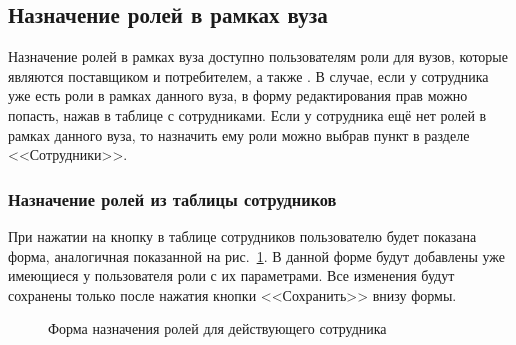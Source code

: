 \subsection{Назначение ролей в рамках вуза} \label{sec:university_role}

Назначение ролей в рамках вуза доступно пользователям роли  для вузов, которые являются поставщиком и потребителем, а также . В случае, если у сотрудника
уже есть роли в рамках данного вуза, в форму редактирования прав можно попасть, нажав  в 
таблице с сотрудниками. Если у сотрудника ещё нет ролей в рамках данного вуза, то назначить ему роли можно выбрав пункт 
 в разделе <<Сотрудники>>.

\subsubsection{Назначение ролей из таблицы сотрудников}

При нажатии на кнопку  в таблице сотрудников пользователю будет показана форма, 
аналогичная показанной на рис.~\ref{img:employee:individual_form}. В данной форме будут добавлены уже имеющиеся у пользователя роли
с их параметрами. Все изменения будут сохранены только после нажатия кнопки <<Сохранить>> внизу формы.

\begin{figure}[H]
	\caption{Форма назначения ролей для действующего сотрудника}
	\label{img:employee:individual_form}
\end{figure}

